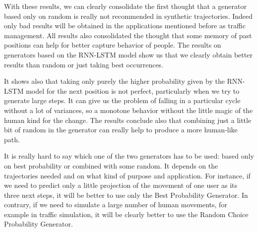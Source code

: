 \documentclass[a4]{article}
\begin{document}
With these results, we can clearly consolidate the first thought that a generator based only on random is really not recommended in synthetic trajectories. Indeed only bad results will be obtained in the applications mentioned before as traffic management. All results also consolidated the thought that some memory of past positions can help for better capture behavior of people. The results on generators based on the RNN-LSTM model show us that we clearly obtain better results than random or just taking best occurrences.

It shows also that taking only purely the higher probability given by the RNN-LSTM model for the next position is not perfect, particularly when we try to generate large steps. It can give us the problem of falling in a particular cycle without a lot of variances, so a monotone behavior without the little magic of the human kind for the change. The results conclude also that combining just a little bit of random in the generator can really help to produce a more human-like path. 

It is really hard to say which one of the two generators has to be used: based only on best probability or combined with some random. It depends on the trajectories needed and on what kind of purpose and application. For instance, if we need to predict only a little projection of the movement of one user as its three next steps, it will be better to use only the Best Probability Generator. In contrary, if we need to simulate a large number of human movements, for example in traffic simulation, it will be clearly better to use the Random Choice Probability Generator.


\newpage
\end{document}
